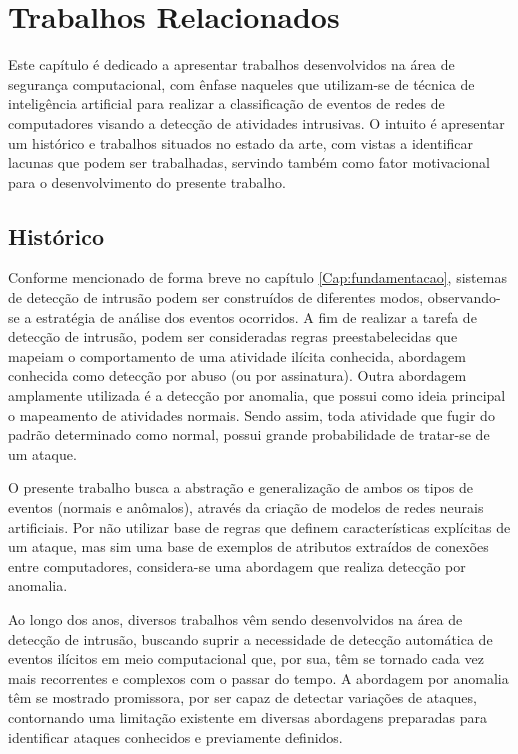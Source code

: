 \chapter{Trabalhos Relacionados}
\label{relacionados}

Este capítulo é dedicado a apresentar trabalhos desenvolvidos na área de segurança computacional, com ênfase naqueles que utilizam-se de técnica de inteligência artificial para realizar a classificação de eventos de redes de computadores visando a detecção de atividades intrusivas. O intuito é apresentar um histórico e trabalhos situados no estado da arte, com vistas a identificar lacunas que podem ser trabalhadas, servindo também como fator motivacional para o desenvolvimento do presente trabalho.


\section{Histórico}

Conforme mencionado de forma breve no capítulo \ref{Cap:fundamentacao}, sistemas de detecção de intrusão podem ser construídos de diferentes modos, observando-se a  estratégia de análise dos eventos ocorridos. A fim de realizar a tarefa de detecção de intrusão, podem ser consideradas regras preestabelecidas que mapeiam o comportamento de uma atividade ilícita conhecida, abordagem conhecida como detecção por abuso (ou por assinatura). Outra abordagem amplamente utilizada é a detecção por anomalia, que possui como ideia principal o mapeamento de atividades normais. Sendo assim, toda atividade que fugir do padrão determinado como normal, possui grande probabilidade de tratar-se de um ataque.

O presente trabalho busca a abstração e generalização de ambos os tipos de eventos (normais e anômalos), através da criação de modelos de redes neurais artificiais. Por não utilizar base de regras que definem características explícitas de um ataque, mas sim uma base de exemplos de atributos extraídos de conexões entre computadores, considera-se uma abordagem que realiza detecção por anomalia.

Ao longo dos anos, diversos trabalhos vêm sendo desenvolvidos na área de detecção de intrusão, buscando suprir a necessidade de detecção automática de eventos ilícitos em meio computacional que, por sua, têm se tornado cada vez mais recorrentes e complexos com o passar do tempo. A abordagem por anomalia têm se mostrado promissora, por ser capaz de detectar variações de ataques, contornando uma limitação existente em diversas abordagens preparadas para identificar ataques conhecidos e previamente definidos.

